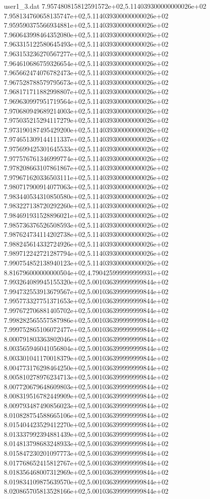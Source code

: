 \begin{filecontents}{user1_3.dat}
7.957480815812591572e+02,5.114039300000000026e+02
7.958134760658135747e+02,5.114039300000000026e+02
7.959590375566934881e+02,5.114039300000000026e+02
7.960643998464352080e+02,5.114039300000000026e+02
7.963315122580645493e+02,5.114039300000000026e+02
7.963153236270567277e+02,5.114039300000000026e+02
7.964610686759326654e+02,5.114039300000000026e+02
7.965662474076782473e+02,5.114039300000000026e+02
7.967528788579795673e+02,5.114039300000000026e+02
7.968171711882998807e+02,5.114039300000000026e+02
7.969630997951719564e+02,5.114039300000000026e+02
7.970680949689214003e+02,5.114039300000000026e+02
7.975035215294117279e+02,5.114039300000000026e+02
7.973190187495429200e+02,5.114039300000000026e+02
7.974651309144111337e+02,5.114039300000000026e+02
7.975699425301645533e+02,5.114039300000000026e+02
7.977576761346999774e+02,5.114039300000000026e+02
7.978208663107861867e+02,5.114039300000000026e+02
7.979671620336503111e+02,5.114039300000000026e+02
7.980717900914077063e+02,5.114039300000000026e+02
7.983440534310850580e+02,5.114039300000000026e+02
7.983227138720292260e+02,5.114039300000000026e+02
7.984691931528896021e+02,5.114039300000000026e+02
7.985736376526508593e+02,5.114039300000000026e+02
7.987624734114202738e+02,5.114039300000000026e+02
7.988245614332724926e+02,5.114039300000000026e+02
7.989712242721287794e+02,5.114039300000000026e+02
7.990754852138940123e+02,5.114039300000000026e+02
8.816796000000000504e+02,4.790425999999999931e+02
7.993264089945155320e+02,5.001036399999999844e+02
7.994732553913679567e+02,5.001036399999999844e+02
7.995773327751371653e+02,5.001036399999999844e+02
7.997672706881405702e+02,5.001036399999999844e+02
7.998282565557587986e+02,5.001036399999999844e+02
7.999752865106072477e+02,5.001036399999999844e+02
8.000791803363802046e+02,5.001036399999999844e+02
8.003565946041056804e+02,5.001036399999999844e+02
8.003301041170018379e+02,5.001036399999999844e+02
8.004773176298464250e+02,5.001036399999999844e+02
8.005810278976234713e+02,5.001036399999999844e+02
8.007720679648609803e+02,5.001036399999999844e+02
8.008319516782449909e+02,5.001036399999999844e+02
8.009793487490856023e+02,5.001036399999999844e+02
8.010828754588665106e+02,5.001036399999999844e+02
8.015404423529412270e+02,5.001036399999999844e+02
8.013337992394881439e+02,5.001036399999999844e+02
8.014813798683248933e+02,5.001036399999999844e+02
8.015847230201097773e+02,5.001036399999999844e+02
8.017768652415812767e+02,5.001036399999999844e+02
8.018356468007312969e+02,5.001036399999999844e+02
8.019834109875639570e+02,5.001036399999999844e+02
8.020865705813528166e+02,5.001036399999999844e+02

\end{filecontents}
